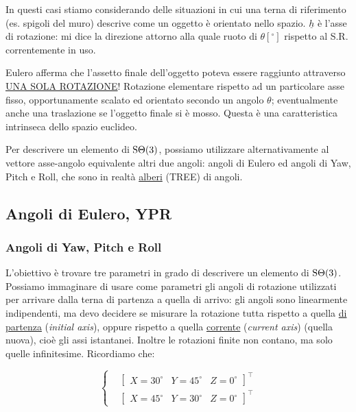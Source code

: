 In questi casi stiamo considerando delle situazioni in cui una terna di riferimento (es. spigoli del muro) descrive come un oggetto è orientato nello spazio. $\underline{h}$ è l'asse di rotazione: mi dice la direzione attorno alla quale ruoto di $\theta[^{\circ}]$ rispetto al S.R. correntemente in uso.

Eulero afferma che l'assetto finale dell'oggetto poteva essere raggiunto attraverso \newline\underline{UNA SOLA ROTAZIONE}! Rotazione elementare rispetto ad un particolare asse fisso, opportunamente scalato ed orientato secondo un angolo $\theta$; eventualmente anche una traslazione se l'oggetto finale si è mosso. Questa è una caratteristica intrinseca dello spazio euclideo.

Per descrivere un elemento di $\operatorname{S\Theta}(3)$, possiamo utilizzare alternativamente al vettore asse-angolo equivalente altri due angoli: angoli di Eulero ed angoli di Yaw, Pitch e Roll, che sono in realtà \underline{alberi} (TREE) di angoli.

\subsection{Angoli di Eulero, YPR}

\subsubsection{Angoli di Yaw, Pitch e Roll}

L'obiettivo è trovare tre parametri in grado di descrivere un elemento di $\operatorname{S\Theta}(3)$. Possiamo immaginare di usare come parametri gli angoli di rotazione utilizzati per arrivare dalla terna di partenza a quella di arrivo: gli angoli sono linearmente indipendenti, ma devo decidere se misurare la rotazione tutta rispetto a quella \underline{di partenza} (\textit{initial axis}), oppure rispetto a quella \underline{corrente} (\textit{current axis}) (quella nuova), cioè gli assi istantanei. Inoltre le rotazioni finite non contano, ma solo quelle infinitesime. Ricordiamo che:

\[
	\left\{
	\begin{aligned}
	&\begin{bmatrix}X=30^{\circ}&Y=45^{\circ}&Z=0^{\circ}\end{bmatrix}^\top\\
	&\begin{bmatrix}X=45^{\circ}&Y=30^{\circ}&Z=0^{\circ}\end{bmatrix}^\top
	\end{aligned}
	\right.
\]

